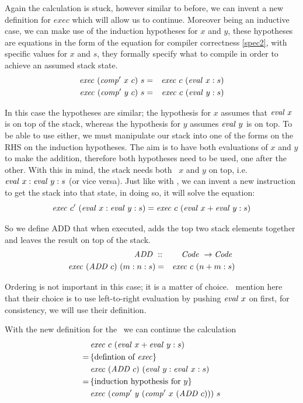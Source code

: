 \documentclass {article}
\begin{document}
Again the calculation is stuck, however similar to before, 
we can invent a new definition for $exec$ which 
will allow us to continue.
Moreover being an inductive case, 
we can make use of the induction 
hypotheses for $x$ and $y$,
these hypotheses are equations in the form
of the equation for compiler correctness \ref{spec2},
with specific values for $x$ and $s$,
they formally specify what to compile in order to achieve
an assumed stack state.
\begin{eqnarray*}
\mathit{exec\ } (\mathit{comp'\ }  x\ c)\ s &=& \mathit{exec\ } c\ (\mathit{eval\ }  x:s) \\
\mathit{exec\ } (\mathit{comp'\ }  y\ c)\ s &=& \mathit{exec\ } c\ (\mathit{eval\ }  y:s) 
\end{eqnarray*}

In this case the hypotheses are similar;
the hypothesis for $x$ assumes that $\mathit{eval\ } x$
is on top of the stack,
whereas the hypothesis for $y$ assumes $\mathit{eval\ } y$
is on top.
To be able to use either, we must manipulate 
our stack into one of the forms on the RHS
on the induction hypotheses.
The aim is to have both evaluations of $x$ and $y$
to make the addition,
therefore both hypotheses need to be used,
one after the other.
With this in mind, 
the stack needs both \eval\ $x$ and $y$ on top, i.e. 
 \( \mathit{eval\ } x : \mathit{eval\ } y : s \)
(or vice versa).
Just like with \val,
we can invent a new instruction
to get the stack into that state,
in doing so, it will solve the equation:
\begin{equation*}
\mathit{exec\ }  c'\ (\mathit{eval\ } x : \mathit{eval\ } y : s) 
	= \mathit{exec\ }  c\ (\mathit{eval\ } x + \mathit{eval\ } y :s)
\end{equation*}

\newcommand{\ADDt}{\textit{ADD}}
\newcommand{\ADD}{\mathit{ADD\ }}

So we define ADD that
when executed, adds the top two stack elements
together and leaves the result on top of the stack.
\begin{eqnarray}
\ADD &::& \Code \rightarrow \Code \nonumber \\
\Exec (\ADD c)\ (m:n:s) &=& \Exec c\ (n+m:s)
\end{eqnarray}

Ordering is not important in this case; it is a matter of choice.
\BH\ mention here that their choice is to use
left-to-right evaluation by pushing $\mathit{eval\ } x$ on first,
for consistency, we will use their definition.

With the new definition for the 
\exec\ we can continue the calculation 
\begin{align*}
&\Exec c\ (\evalf x + \evalf y :s) \\
=\, & \{ \mbox{defintion of \exec}\} \\
&\Exec (\ADD c)\ (\evalf  y : \evalf  x : s) \\
=\, & \{ \mbox{induction hypothesis for}\  y \} \\
&\Exec (\Compp y\ (\Compp x\ (\ADD c)))\ s
\end{align*}
\end{document}
